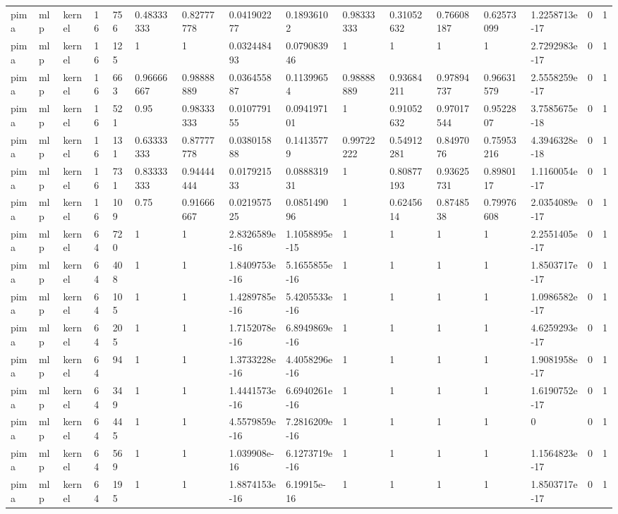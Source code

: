 \begin{tabular}{llllllllllllllll}
pima & mlp & kernel & 16 & 756 & 0.48333333 & 0.82777778 & 0.041902277 & 0.18936102 & 0.98333333 & 0.31052632 & 0.76608187 & 0.62573099 & 1.2258713e-17 & 0 & 1 \\
pima & mlp & kernel & 16 & 125 & 1 & 1 & 0.032448493 & 0.079083946 & 1 & 1 & 1 & 1 & 2.7292983e-17 & 0 & 1 \\
pima & mlp & kernel & 16 & 663 & 0.96666667 & 0.98888889 & 0.036455887 & 0.11399654 & 0.98888889 & 0.93684211 & 0.97894737 & 0.96631579 & 2.5558259e-17 & 0 & 1 \\
pima & mlp & kernel & 16 & 521 & 0.95 & 0.98333333 & 0.010779155 & 0.094197101 & 1 & 0.91052632 & 0.97017544 & 0.9522807 & 3.7585675e-18 & 0 & 1 \\
pima & mlp & kernel & 16 & 131 & 0.63333333 & 0.87777778 & 0.038015888 & 0.14135779 & 0.99722222 & 0.54912281 & 0.8497076 & 0.75953216 & 4.3946328e-18 & 0 & 1 \\
pima & mlp & kernel & 16 & 731 & 0.83333333 & 0.94444444 & 0.017921533 & 0.088831931 & 1 & 0.80877193 & 0.93625731 & 0.8980117 & 1.1160054e-17 & 0 & 1 \\
pima & mlp & kernel & 16 & 109 & 0.75 & 0.91666667 & 0.021957525 & 0.085149096 & 1 & 0.6245614 & 0.8748538 & 0.79976608 & 2.0354089e-17 & 0 & 1 \\
pima & mlp & kernel & 64 & 720 & 1 & 1 & 2.8326589e-16 & 1.1058895e-15 & 1 & 1 & 1 & 1 & 2.2551405e-17 & 0 & 1 \\
pima & mlp & kernel & 64 & 408 & 1 & 1 & 1.8409753e-16 & 5.1655855e-16 & 1 & 1 & 1 & 1 & 1.8503717e-17 & 0 & 1 \\
pima & mlp & kernel & 64 & 105 & 1 & 1 & 1.4289785e-16 & 5.4205533e-16 & 1 & 1 & 1 & 1 & 1.0986582e-17 & 0 & 1 \\
pima & mlp & kernel & 64 & 205 & 1 & 1 & 1.7152078e-16 & 6.8949869e-16 & 1 & 1 & 1 & 1 & 4.6259293e-17 & 0 & 1 \\
pima & mlp & kernel & 64 & 94 & 1 & 1 & 1.3733228e-16 & 4.4058296e-16 & 1 & 1 & 1 & 1 & 1.9081958e-17 & 0 & 1 \\
pima & mlp & kernel & 64 & 349 & 1 & 1 & 1.4441573e-16 & 6.6940261e-16 & 1 & 1 & 1 & 1 & 1.6190752e-17 & 0 & 1 \\
pima & mlp & kernel & 64 & 445 & 1 & 1 & 4.5579859e-16 & 7.2816209e-16 & 1 & 1 & 1 & 1 & 0 & 0 & 1 \\
pima & mlp & kernel & 64 & 569 & 1 & 1 & 1.039908e-16 & 6.1273719e-16 & 1 & 1 & 1 & 1 & 1.1564823e-17 & 0 & 1 \\
pima & mlp & kernel & 64 & 195 & 1 & 1 & 1.8874153e-16 & 6.19915e-16 & 1 & 1 & 1 & 1 & 1.8503717e-17 & 0 & 1 \\

\end{tabular}
